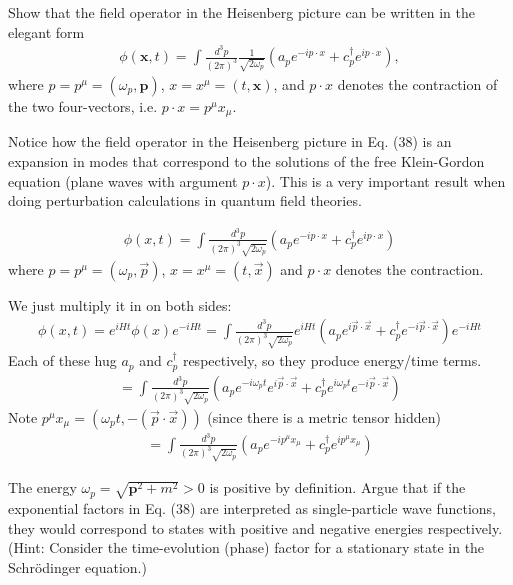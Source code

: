 \documentclass[working, oneside]{../../Preambles/tuftebook}
\begin{document}
\begin{exercise}[7]
Show that the field operator in the Heisenberg picture can be written in the elegant form
\begin{align*}
    \phi(\mathbf{x}, t) = \int \frac{d^3p}{(2\pi)^3} \frac{1}{\sqrt{2\omega_p}} \left( a_p e^{-ip \cdot x} + c_p^\dagger e^{ip \cdot x} \right), \tag{38}
\end{align*}
where \( p = p^\mu = (\omega_p, \mathbf{p}) \), \( x = x^\mu = (t, \mathbf{x}) \), and \( p \cdot x \) denotes the contraction of the two four-vectors, i.e. \( p \cdot x = p^\mu x_\mu \).

Notice how the field operator in the Heisenberg picture in Eq. (38) is an expansion in modes that correspond to the solutions of the free Klein-Gordon equation (plane waves with argument \( p \cdot x \)). This is a very important result when doing perturbation calculations in quantum field theories.
\end{exercise}
\begin{solution}
\begin{align*}
\phi(x, t) = \int \frac{d^3p}{(2\pi)^3 \sqrt{2\omega_p}} \left( a_p e^{-i p \cdot x} + c_p^\dagger e^{i p \cdot x} \right)
\end{align*}
where $p = p^\mu = (\omega_p, \vec{p})$, $x = x^\mu = (t, \vec{x})$ and $p \cdot x$ denotes the contraction.

We just multiply it in on both sides:
\begin{align*}
\phi(x, t) = e^{iHt} \phi(x) e^{-iHt} = \int \frac{d^3p}{(2\pi)^3 \sqrt{2\omega_p}} e^{iHt} \left( a_p e^{i \vec{p} \cdot \vec{x}} + c_p^\dagger e^{-i \vec{p} \cdot \vec{x}} \right) e^{-iHt}
\end{align*}
Each of these hug $a_p$ and $c_p^\dagger$ respectively, so they produce energy/time terms.
\begin{align*}
= \int \frac{d^3p}{(2\pi)^3 \sqrt{2\omega_p}} \left( a_p e^{-i \omega_p t} e^{i \vec{p} \cdot \vec{x}} + c_p^\dagger e^{i \omega_p t} e^{-i \vec{p} \cdot \vec{x}} \right)
\end{align*}
Note $p^\mu x_\mu = (\omega_p t, -(\vec{p} \cdot \vec{x}))$ (since there is a metric tensor hidden)
\begin{align*}
= \int \frac{d^3p}{(2\pi)^3 \sqrt{2\omega_p}} \left( a_p e^{-i p^\mu x_\mu} + c_p^\dagger e^{i p^\mu x_\mu} \right)
\end{align*}
\end{solution}
\begin{exercise}[8]
The energy \( \omega_p = \sqrt{\mathbf{p}^2 + m^2} > 0 \) is positive by definition. Argue that if the exponential factors in Eq. (38) are interpreted as single-particle wave functions, they would correspond to states with positive and negative energies respectively. (Hint: Consider the time-evolution (phase) factor for a stationary state in the Schrödinger equation.)
\end{exercise}
\end{document}
